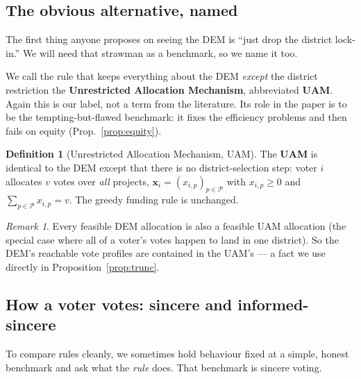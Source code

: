 \documentclass[11pt,letterpaper]{article}
\theoremstyle{definition}
\newtheorem{definition}{Definition}[section]
\theoremstyle{plain}
\theoremstyle{remark}
\newtheorem*{remark}{Remark}
\newcommand{\Pset}{\mathcal{P}}
\newcommand{\votes}{v}
\begin{document}
\subsection{The obvious alternative, named}

The first thing anyone proposes on seeing the DEM is ``just drop the district lock-in.'' We will
need that strawman as a benchmark, so we name it too.

\begin{naming}
We call the rule that keeps everything about the DEM \emph{except} the district restriction the
\textbf{Unrestricted Allocation Mechanism}, abbreviated \textbf{UAM}. Again this is our label, not
a term from the literature. Its role in the paper is to be the tempting-but-flawed benchmark: it
fixes the efficiency problems and then fails on equity (Prop.~\ref{prop:equity}).
\end{naming}

\begin{definition}[Unrestricted Allocation Mechanism, UAM]
\label{def:uam}
The \textbf{UAM} is identical to the DEM except that there is no district-selection step: voter
$i$ allocates $\votes$ votes over \emph{all} projects, $\mathbf{x}_i=(x_{i,p})_{p\in\Pset}$ with
$x_{i,p}\ge0$ and $\sum_{p\in\Pset}x_{i,p}=\votes$. The greedy funding rule is unchanged.
\end{definition}

\begin{remark}
Every feasible DEM allocation is also a feasible UAM allocation (the special case where all of a
voter's votes happen to land in one district). So the DEM's reachable vote profiles are contained
in the UAM's --- a fact we use directly in Proposition~\ref{prop:trunc}.
\end{remark}

\subsection{How a voter votes: sincere and informed-sincere}

To compare rules cleanly, we sometimes hold behaviour fixed at a simple, honest benchmark and ask
what the \emph{rule} does. That benchmark is sincere voting.
\end{document}
